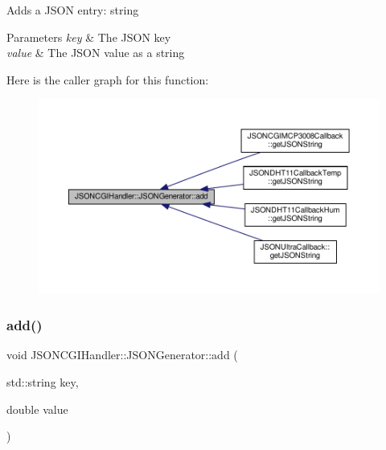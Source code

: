 Adds a J\+S\+ON entry\+: string 
\begin{DoxyParams}{Parameters}
{\em key} & The J\+S\+ON key \\
\hline
{\em value} & The J\+S\+ON value as a string \\
\hline
\end{DoxyParams}
Here is the caller graph for this function\+:
\nopagebreak
\begin{figure}[H]
\begin{center}
\leavevmode
\includegraphics[width=350pt]{classJSONCGIHandler_1_1JSONGenerator_a191efd00967cbace0d9ddfedea39cd9b_icgraph}
\end{center}
\end{figure}
\mbox{\label{classJSONCGIHandler_1_1JSONGenerator_aa25099deb2442335298ab1c021f36910}} 
\subsubsection{\texorpdfstring{add()}{add()}\hspace{0.1cm}{\footnotesize\ttfamily [2/5]}}
{\footnotesize\ttfamily void J\+S\+O\+N\+C\+G\+I\+Handler\+::\+J\+S\+O\+N\+Generator\+::add (\begin{DoxyParamCaption}\item[{std\+::string}]{key,  }\item[{double}]{value }\end{DoxyParamCaption})\hspace{0.3cm}{\ttfamily [inline]}}

